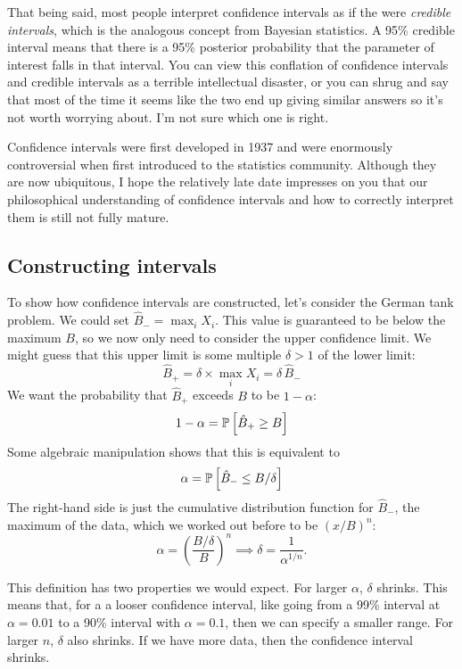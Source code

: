 That being said, most people interpret confidence intervals as if the were
\emph{credible intervals}, which is the analogous concept from Bayesian
statistics. A 95\% credible interval means that there is a 95\% posterior
probability that the parameter of interest falls in that interval. You can
view this conflation of confidence intervals and credible intervals as a
terrible intellectual disaster, or you can shrug and say that most of the time
it seems like the two end up giving similar answers so it's not worth worrying
about. I'm not sure which one is right.

Confidence intervals were first developed in 1937 and were enormously
controversial when first introduced to the statistics community. Although they
are now ubiquitous, I hope the relatively late date impresses on you that our
philosophical understanding of confidence intervals and how to correctly
interpret them is still not fully mature.

\subsection{Constructing intervals}

To show how confidence intervals are constructed, let's consider the German
tank problem. We could set $\hat{B}_- = \max_i X_i$. This value is guaranteed
to be below the maximum $B$, so we now only need to consider the upper
confidence limit. We might guess that this upper limit is some multiple
$\delta > 1$ of the lower limit:
\begin{equation}
  \hat{B}_+ = \delta \times \max_i X_i = \delta \, \hat{B}_-
\end{equation}
We want the probability that $\hat{B}_+$ exceeds $B$ to be $1 - \alpha$:
\begin{equation}
  1 - \alpha = \mathbb{P}\left[{\hat{B}_+ \geq B}\right]
\end{equation}
Some algebraic manipulation shows that this is equivalent to
\begin{equation}
  \alpha = \mathbb{P}\left[{\hat{B}_- \leq B / \delta}\right]
\end{equation}
The right-hand side is just the cumulative distribution function for
$\hat{B}_-$, the maximum of the data, which we worked out before to be
$(x/B)^n$:
\begin{equation}
  \alpha = \left( \frac{B / \delta}{B} \right)^n \implies \delta = \frac{1}{\alpha^{1/n}}.
\end{equation}

This definition has two properties we would expect. For larger $\alpha$,
$\delta$ shrinks. This means that, for a a looser confidence interval, like
going from a 99\% interval at $\alpha = 0.01$ to a 90\% interval with $\alpha
= 0.1$, then we can specify a smaller range. For larger $n$, $\delta$ also
shrinks. If we have more data, then the confidence interval shrinks.

